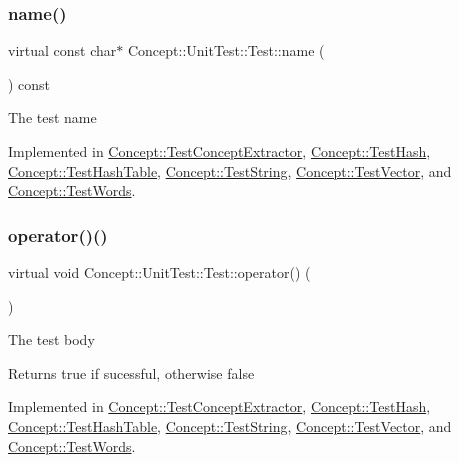 \subsubsection{\texorpdfstring{name()}{name()}}
{\footnotesize\ttfamily virtual const char$\ast$ Concept\+::\+Unit\+Test\+::\+Test\+::name (\begin{DoxyParamCaption}{ }\end{DoxyParamCaption}) const\hspace{0.3cm}{\ttfamily [pure virtual]}}

The test name 

Implemented in \mbox{\hyperlink{class_concept_1_1_test_concept_extractor_a6b957e2b9689545c23e800e67e33196a}{Concept\+::\+Test\+Concept\+Extractor}}, \mbox{\hyperlink{class_concept_1_1_test_hash_a5bfa2f26b227562240a70d23f1df2018}{Concept\+::\+Test\+Hash}}, \mbox{\hyperlink{class_concept_1_1_test_hash_table_ace0c357ea2d8dbd2cc7d7d8dae9e35ec}{Concept\+::\+Test\+Hash\+Table}}, \mbox{\hyperlink{class_concept_1_1_test_string_a0d43f2724c9d8c3eec87076cdd418461}{Concept\+::\+Test\+String}}, \mbox{\hyperlink{class_concept_1_1_test_vector_a4ac7a2e867dc34adb9ed55c38046838b}{Concept\+::\+Test\+Vector}}, and \mbox{\hyperlink{class_concept_1_1_test_words_a1466d72428143b610937c692545de6f3}{Concept\+::\+Test\+Words}}.

\mbox{\label{class_concept_1_1_unit_test_1_1_test_aa8c081714f642696eeef640911be752a}} 
\subsubsection{\texorpdfstring{operator()()}{operator()()}}
{\footnotesize\ttfamily virtual void Concept\+::\+Unit\+Test\+::\+Test\+::operator() (\begin{DoxyParamCaption}{ }\end{DoxyParamCaption})\hspace{0.3cm}{\ttfamily [pure virtual]}}

The test body \begin{DoxyReturn}{Returns}
true if sucessful, otherwise false 
\end{DoxyReturn}


Implemented in \mbox{\hyperlink{class_concept_1_1_test_concept_extractor_a32d377bd7d03420a7f470a840cd654cc}{Concept\+::\+Test\+Concept\+Extractor}}, \mbox{\hyperlink{class_concept_1_1_test_hash_aaa06219ede091614bb050ede4f8676f0}{Concept\+::\+Test\+Hash}}, \mbox{\hyperlink{class_concept_1_1_test_hash_table_a64943226aff8a1ac3f3d1b875159bdfe}{Concept\+::\+Test\+Hash\+Table}}, \mbox{\hyperlink{class_concept_1_1_test_string_a4d493ef2d0632c5015042821be5682ff}{Concept\+::\+Test\+String}}, \mbox{\hyperlink{class_concept_1_1_test_vector_ac53c3efce4e5a4adad27e65d5486313d}{Concept\+::\+Test\+Vector}}, and \mbox{\hyperlink{class_concept_1_1_test_words_ac268229701b31e0aab5764227b9cdf0b}{Concept\+::\+Test\+Words}}.

